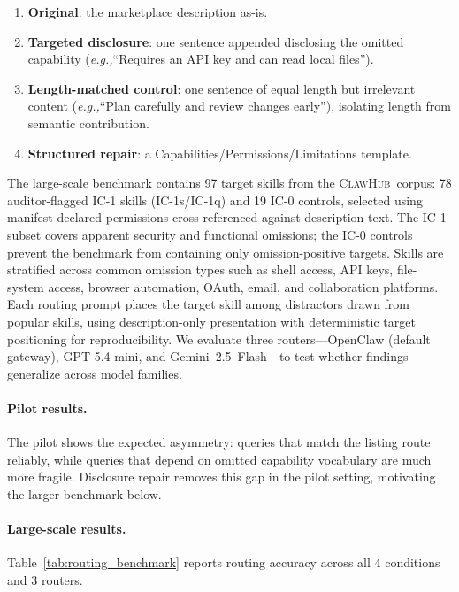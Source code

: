 \documentclass[11pt]{article}
\newcommand{\clawhub}{\textsc{ClawHub}\xspace}
\newcommand{\eg}{\textit{e.g.,}\xspace}
\begin{document}
\begin{enumerate}[nosep,leftmargin=1.2em]
  \item \textbf{Original}: the marketplace description
        as-is.
  \item \textbf{Targeted disclosure}: one sentence appended
        disclosing the omitted capability
        (\eg ``Requires an API key and can read local files'').
  \item \textbf{Length-matched control}: one sentence of
        equal length but irrelevant content
        (\eg ``Plan carefully and review changes early''),
        isolating length from semantic contribution.
  \item \textbf{Structured repair}: a
        Capabilities/Permissions/Limitations template.
\end{enumerate}

The large-scale benchmark contains 97 target skills from
the \clawhub\ corpus: 78 auditor-flagged IC-1 skills
(IC-1s/IC-1q) and 19 IC-0 controls, selected using
manifest-declared permissions cross-referenced against
description text. The IC-1 subset covers apparent security
and functional omissions; the IC-0 controls prevent the
benchmark from containing only omission-positive targets.
Skills are stratified across common omission types
such as shell access, API keys, file-system access,
browser automation, OAuth, email, and collaboration
platforms.
Each routing prompt places the target skill among
distractors drawn from popular skills, using
description-only presentation with deterministic
target positioning for reproducibility.
We evaluate three routers---OpenClaw (default gateway),
GPT-5.4-mini, and Gemini~2.5~Flash---to test whether
findings generalize across model families.

\paragraph{Pilot results.}
The pilot shows the expected asymmetry: queries that
match the listing route reliably, while queries that
depend on omitted capability vocabulary are much more
fragile. Disclosure repair removes this gap in the
pilot setting, motivating the larger benchmark below.

\paragraph{Large-scale results.}
Table~\ref{tab:routing_benchmark} reports routing
accuracy across all 4 conditions and 3 routers.
\end{document}
